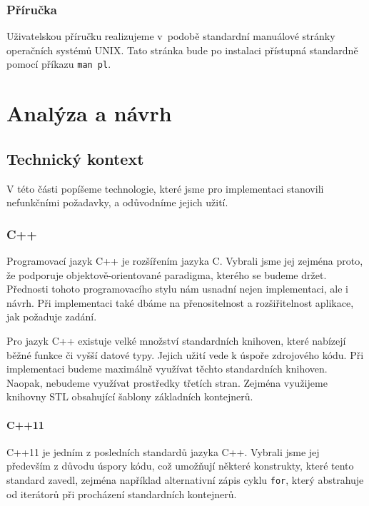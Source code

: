 \documentclass[thesis=B,czech,hidelinks]{thesis}[2012/06/26]
\begin{document}
\subsection{Příručka}

Uživatelskou příručku realizujeme v~podobě standardní manuálové stránky operačních systémů UNIX. Tato stránka bude po instalaci přístupná standardně pomocí příkazu \texttt{man pl}.

%
%
%

\chapter{Analýza a návrh}

\section{Technický kontext}

V této části popíšeme technologie, které jsme pro implementaci stanovili nefunkčními požadavky, a odůvodníme jejich užití.

\subsection{C++}

Programovací jazyk C++ je rozšířením jazyka C. Vybrali jsme jej zejména proto, že podporuje objektově-orientované paradigma, kterého se budeme držet. Přednosti tohoto programovacího stylu nám usnadní nejen implementaci, ale i návrh. Při implementaci také dbáme na přenositelnost a rozšiřitelnost aplikace, jak požaduje zadání.

Pro jazyk C++ existuje velké množství standardních knihoven, které nabízejí běžné funkce či vyšší datové typy. Jejich užití vede k úspoře zdrojového kódu. Při implementaci budeme maximálně využívat těchto standardních knihoven. Naopak, nebudeme využívat prostředky třetích stran. Zejména využijeme knihovny STL obsahující šablony základních kontejnerů.

\subsubsection{C++11}

C++11 je jedním z posledních standardů jazyka C++. Vybrali jsme jej především z důvodu úspory kódu, což umožňují některé konstrukty, které tento standard zavedl, zejména například alternativní zápis cyklu \texttt{for}, který abstrahuje od iterátorů při procházení standardních kontejnerů.
\end{document}
